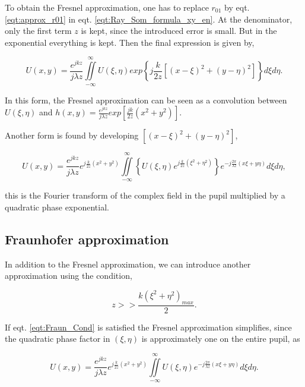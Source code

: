 To obtain the Fresnel approximation, one has to replace $r_{01}$ by eqt. \eqref{eqt:approx_r01} in eqt. \eqref{eqt:Ray_Som_formula_xy_en}. At the denominator, only the first term $z$ is kept, since the introduced error is small. But in the exponential everything is kept. Then the final expression is given by,

\begin{equation}
U(x,y) = \frac{e^{jkz}}{j\lambda z} \iint\limits_{-\infty}^{\infty} U(\xi,\eta)exp \left\lbrace j \frac{k}{2z}\left[(x-\xi)^2+(y-\eta)^2\right]\right\rbrace d\xi d\eta.
\label{eqt:fresnel_Approx_conv}
\end{equation}

In this form, the Fresnel approximation can be seen as a convolution between $U(\xi,\eta)$ and $h(x,y) = \frac{e^{jkz}}{j\lambda z}exp\left[\frac{jk}{2z}\left(x^2+y^2\right)\right]$.

Another form is found by developing $\left[(x-\xi)^2+(y-\eta)^2\right]$,

\begin{equation}
U(x,y) = \frac{e^{jkz}}{j\lambda z} e^{j\frac{k}{2z}(x^2+y^2)} \iint\limits_{-\infty}^{\infty} \left\lbrace U(\xi,\eta) e^{j\frac{k}{2z}(\xi^2+\eta^2)}\right\rbrace e^{-j\frac{2\pi}{\lambda z}(x\xi+y\eta)} d\xi d\eta,
\label{eqt:fresnel_Approx_FT}
\end{equation}

this is the Fourier transform of the complex field in the pupil multiplied by a quadratic phase exponential.

\subsection{Fraunhofer approximation}
\label{subsec:FraunhoferApprox}

In addition to the Fresnel approximation, we can introduce another approximation using the condition,

\begin{equation}
z >> \frac{k(\xi^2+\eta^2)_{max}}{2}.
\label{eqt:Fraun_Cond}
\end{equation}

If eqt. \eqref{eqt:Fraun_Cond} is satisfied the Fresnel approximation simplifies, since the quadratic phase factor in $(\xi,\eta)$ is approximately one on the entire pupil, as

\begin{equation}
U(x,y) = \frac{e^{jkz}}{j\lambda z} e^{j\frac{k}{2z}(x^2+y^2)} \iint\limits_{-\infty}^{\infty} U(\xi,\eta) e^{-j\frac{2\pi}{\lambda z}(x\xi+y\eta)} d\xi d\eta.
\label{eqt:Fraunhofer_approx}  
\end{equation}

